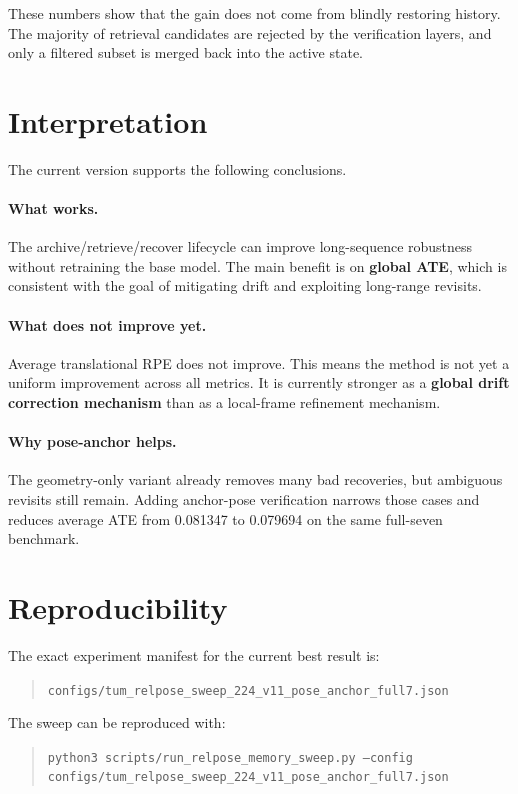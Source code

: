\documentclass[11pt]{article}
\begin{document}
These numbers show that the gain does not come from blindly restoring history.
The majority of retrieval candidates are rejected by the verification layers,
and only a filtered subset is merged back into the active state.

\section{Interpretation}
The current version supports the following conclusions.

\paragraph{What works.}
The archive/retrieve/recover lifecycle can improve long-sequence robustness
without retraining the base model. The main benefit is on \textbf{global ATE},
which is consistent with the goal of mitigating drift and exploiting long-range
revisits.

\paragraph{What does not improve yet.}
Average translational RPE does not improve. This means the method is not yet a
uniform improvement across all metrics. It is currently stronger as a
\textbf{global drift correction mechanism} than as a local-frame refinement
mechanism.

\paragraph{Why pose-anchor helps.}
The geometry-only variant already removes many bad recoveries, but ambiguous
revisits still remain. Adding anchor-pose verification narrows those cases and
reduces average ATE from 0.081347 to 0.079694 on the same full-seven benchmark.

\section{Reproducibility}
The exact experiment manifest for the current best result is:
\begin{quote}
\texttt{configs/tum\_relpose\_sweep\_224\_v11\_pose\_anchor\_full7.json}
\end{quote}

The sweep can be reproduced with:
\begin{quote}
\texttt{python3 scripts/run\_relpose\_memory\_sweep.py --config}\\
\texttt{configs/tum\_relpose\_sweep\_224\_v11\_pose\_anchor\_full7.json}
\end{quote}
\end{document}
